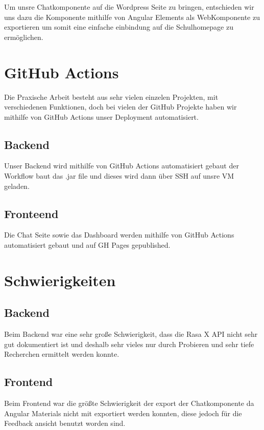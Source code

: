Um unsre Chatkomponente auf die Wordpress Seite zu bringen, entschieden wir uns dazu die Komponente mithilfe von Angular Elements als WebKomponente zu exportieren um somit eine einfache einbindung auf die Schulhomepage zu ermöglichen.

\section{GitHub Actions}

Die Praxische Arbeit besteht aus sehr vielen einzelen Projekten, mit verschiedenen Funktionen, doch bei vielen der GitHub Projekte haben wir mithilfe von GitHub Actions unser Deployment automatisiert.

\subsection{Backend}

Unser Backend wird mithilfe von GitHub Actions automatisiert gebaut der Workflow baut das .jar file und dieses wird dann über SSH auf unsre VM geladen.

\subsection{Fronteend}
Die Chat Seite sowie das Dashboard werden mithilfe von GitHub Actions automatisiert gebaut und auf GH Pages gepublished.

\section{Schwierigkeiten}

\subsection{Backend}
Beim Backend war eine sehr große Schwierigkeit, dass die Rasa X API nicht sehr gut dokumentiert ist und deshalb sehr vieles nur durch Probieren und sehr tiefe Recherchen ermittelt werden konnte.


\subsection{Frontend}
Beim Frontend war die größte Schwierigkeit der export der Chatkomponente da Angular Materials nicht mit exportiert werden konnten, diese jedoch für die Feedback ansicht benutzt worden sind.
